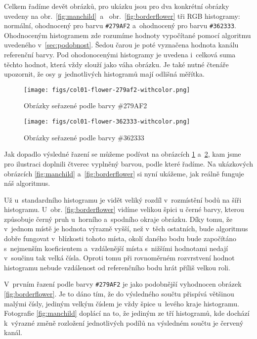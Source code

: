 \documentclass[12pt,oneside,a4paper]{article}
\begin{document}
Celkem řadíme devět obrázků, pro ukázku jsou pro dva konkrétní obrázky uvedeny na obr.~\ref{fig:manchild}~a~ obr.~\ref{fig:borderflower} tři RGB histogramy: normální, ohodnocený pro barvu \verb|#279AF2| a~ohodnocený pro barvu \verb|#362333|. Ohodnoceným histogramem zde rozumíme hodnoty vypočítané pomocí algoritmu uvedeného v~\ref{sec:podobnost}. Šedou čarou je poté vyznačena hodnota kanálu referenční barvy. Pod ohodonocenými histogramy je uvedena i~celková suma těchto hodnot, která vždy slouží jako váha obrázku. Je také nutné čtenáře upozornit, že osy $y$~jednotlivých histogramů mají odlišná měřítka.

\begin{figure} \begin{center}
\texttt{[image: figs/col01-flower-279af2-withcolor.png]} \caption{Obrázky seřazené podle barvy \#279AF2}
\label{fig:279af2}
\end{center} \end{figure}
\begin{figure} \begin{center}
\texttt{[image: figs/col01-flower-362333-withcolor.png]} \caption{Obrázky seřazené podle barvy \#362333}
\label{fig:362333}
\end{center} \end{figure}

Jak dopadlo výsledné řazení se můžeme podívat na obrázcích \ref{fig:279af2} a~\ref{fig:362333}, kam jsme pro ilustraci doplnili čtverec vyplněný barvou, podle které řadíme. Na ukázkových obrázcích \ref{fig:manchild} a~\ref{fig:borderflower} si nyní ukážeme, jak reálně funguje náš algoritmus.

Už u~standardního histogramu je vidět veliký rozdíl v~rozmístění bodů na šíři histogramu. U~obr. \ref{fig:borderflower} vidíme velikou špici u černé barvy, kterou způsobuje černý pruh u~horního a~spodního okraje obrázku. Díky tomu, že v~jednom místě je hodnota výrazně vyšší, než v~těch ostatních, bude algoritmus dobře fungovat v~blízkosti tohoto místa, okolí daného bodu bude započítáno s~nejmenším koeficientem a~vzdálenější místa s~nižšími hodnotami nedají v~součinu tak velká čísla. Oproti tomu při rovnoměrném rozvrstvení hodnot histogramu nebude vzdálenost od referenčního bodu hrát příliš velkou roli.

V~prvním řazení podle barvy \verb|#279AF2| je jako podobnější vyhodnocen obrázek \ref{fig:borderflower}. Je to dáno tím, že do výsledného součtu přispívá většinou malými čísly, jediným velkým číslem je vždy špice u~levého kraje histogramu. Fotografie \ref{fig:manchild} doplácí na to, že jediným ze tří histogramů, kde dochází k~výrazné změně rozložení jednotlivých podílů na výsledném součtu je červený kanál.
\end{document}

